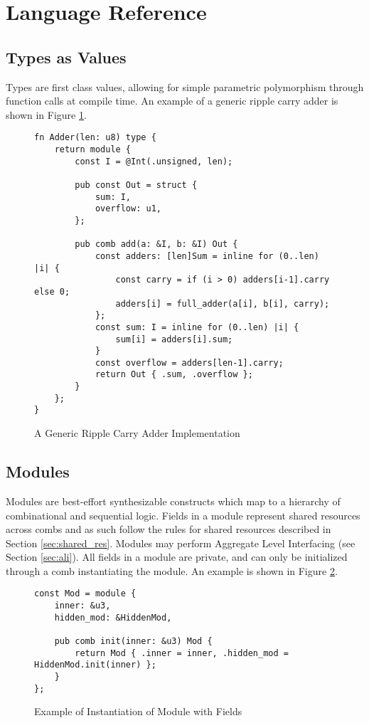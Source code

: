 \documentclass[10pt]{article}
\begin{document}
\section{Language Reference}

\subsection{Types as Values}
Types are first class values, allowing for simple parametric polymorphism through function calls at
compile time. An example of a generic ripple carry adder is shown in Figure \ref{fig:generic_rca}.

\begin{figure}[H]
	\begin{verbatim}
fn Adder(len: u8) type {
    return module {
        const I = @Int(.unsigned, len);

        pub const Out = struct {
            sum: I,
            overflow: u1,
        };

        pub comb add(a: &I, b: &I) Out {
            const adders: [len]Sum = inline for (0..len) |i| {
                const carry = if (i > 0) adders[i-1].carry else 0;
                adders[i] = full_adder(a[i], b[i], carry);
            };
            const sum: I = inline for (0..len) |i| {
                sum[i] = adders[i].sum;
            }
            const overflow = adders[len-1].carry;
            return Out { .sum, .overflow };
        }
    };
}
	\end{verbatim}
	\vspace*{-5mm}
	\caption{A Generic Ripple Carry Adder Implementation}
	\label{fig:generic_rca}
\end{figure}

\subsection{Modules}\label{sec:modules}
Modules are best-effort synthesizable constructs which map to a hierarchy of combinational and
sequential logic. Fields in a module represent shared resources across combs and as such follow the
rules for shared resources described in Section \ref{sec:shared_res}. Modules may perform Aggregate
Level Interfacing (see Section \ref{sec:ali}). All fields in a module are private, and can only be
initialized through a comb instantiating the module. An example is shown in Figure
\ref{fig:mod_fields_inst}.
\begin{figure}[H]
	\begin{verbatim}
const Mod = module {
    inner: &u3,
    hidden_mod: &HiddenMod,

    pub comb init(inner: &u3) Mod {
        return Mod { .inner = inner, .hidden_mod = HiddenMod.init(inner) };
    }
};
	\end{verbatim}
	\vspace*{-5mm}
	\caption{Example of Instantiation of Module with Fields}
	\label{fig:mod_fields_inst}
\end{figure}
\end{document}
